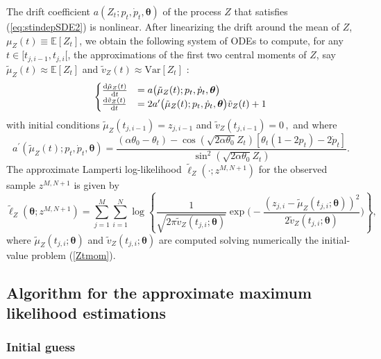 \documentclass[11pt]{article}
\theoremstyle{definition}
\begin{document}
The drift coefficient $a(Z_t; p_t, \dot{p}_t, \bm{\theta}) $ of the process $Z$ that satisfies (\ref{eq:stindepSDE2}) is nonlinear. After linearizing the drift around the mean of $Z$, $\mu_Z(t) \equiv \mathbb{E}\left[Z_t\right]$,  we obtain the following system of ODEs to compute, for any $t\in [t_{j,i-1}, t_{j, i}[$, the approximations of the first two central moments of $Z$, say  $\tilde{\mu}_Z(t) \approx \mathbb{E}\left[Z_t\right]$ and $\tilde{v}_Z(t) \approx \text{Var} \left[Z_t\right]$ :\\
\begin{equation}
\begin{cases}
\frac{\dif  \tilde{\mu}_Z (t)}{\dif t}&=  a\big( \tilde{\mu}_Z (t) ; p_t, \dot{p}_t, \bm{\theta} \big)   \\
\frac{\dif  \tilde{v}_Z (t)}{\dif t}&= 2  a^{\prime} \big( \tilde{\mu}_Z (t) ; p_t, \dot{p}_t, \bm{\theta} \big) \tilde{v}_Z (t) + 1
\end{cases}
\label{Ztmom}
\end{equation}
with initial conditions $\tilde{\mu}_Z(t_{j,i-1})= z_{j, i-1}$ and $\tilde{v}_Z(t_{j,i-1})= 0 \,,$ and where 
\begin{equation*}
a^{\prime} \left( \tilde{\mu}_Z (t) ; p_t, \dot{p}_t, \bm{\theta} \right) =    \frac{  (\alpha \theta_0 - \theta_t)  - \cos(\sqrt{2 \alpha \theta_0 } Z_t) [ \theta_t (1 - 2 p_t) - 2  \dot{p}_t ] }{\sin^2{(\sqrt{2 \alpha \theta_0} Z_t)}}.
\end{equation*}
The approximate Lamperti log-likelihood $\tilde{\ell}_Z\left(\cdot ; z^{M, N+1}\right)$ for the observed sample $z^{M, N+1}$ is given by
\begin{equation}
\tilde{\ell}_Z \left(\bm{\theta}; z^{M,N +1}\right) = \sum_{j=1}^M \sum_{i=1}^N \log \left\{ \frac{1}{\sqrt{2 \pi \tilde{v}_Z(t_{j,i}; \bm{\theta})}} \exp \Bigg( -\frac{(z_{j,i} - \tilde{\mu}_Z(t_{j,i};\bm{\theta} ))^2}{2 \tilde{v}_Z(t_{j,i}; \bm{\theta})} \Bigg) \right\},
\label{loglikelihoodZ}
\end{equation}
where $\tilde{\mu}_Z(t_{j,i};\bm{\theta} )$ and $\tilde{v}_Z(t_{j,i};\bm{\theta} )$ are computed solving numerically the initial-value problem (\ref{Ztmom}). 

\subsection{Algorithm for the approximate maximum likelihood estimations} \label{opt_sec}

\subsubsection{Initial guess}
\end{document}

